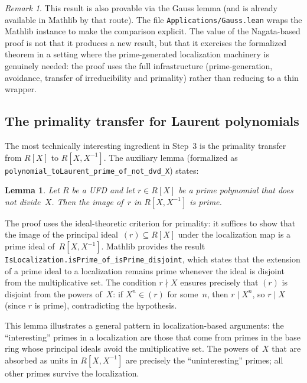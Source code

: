 \documentclass[11pt]{article}
\theoremstyle{plain}
\newtheorem{lemma}[theorem]{Lemma}
\theoremstyle{definition}
\theoremstyle{remark}
\newtheorem{remark}[theorem]{Remark}
\newcommand{\li}[1]{\texorpdfstring{\texttt{#1}}{#1}}
\newcommand{\lf}[1]{\texorpdfstring{\nolinkurl{#1}}{#1}}
\begin{document}
\begin{remark}
This result is also provable via the Gauss lemma (and is already available in
Mathlib by that route).  The file \lf{Applications/Gauss.lean} wraps the
Mathlib instance to make the comparison explicit.  The value of the
Nagata-based proof is not that it produces a new result, but that it exercises
the formalized theorem in a setting where the prime-generated localization
machinery is genuinely needed: the proof uses the full infrastructure
(prime-generation, avoidance, transfer of irreducibility and primality) rather
than reducing to a thin wrapper.
\end{remark}

\subsection{The primality transfer for Laurent polynomials}\label{sec:laurent-prime}

The most technically interesting ingredient in Step~3 is the primality
transfer from $R[X]$ to $R[X,X^{-1}]$.  The auxiliary lemma (formalized as
\li{polynomial\_toLaurent\_prime\_of\_not\_dvd\_X}) states:

\begin{lemma}\label{lem:laurent-prime}
Let $R$ be a UFD and let $r\in R[X]$ be a prime polynomial that does not
divide~$X$.  Then the image of~$r$ in $R[X,X^{-1}]$ is prime.
\end{lemma}

\noindent
The proof uses the ideal-theoretic criterion for primality: it suffices to show
that the image of the principal ideal~$(r)\subseteq R[X]$ under the
localization map is a prime ideal of~$R[X,X^{-1}]$.  Mathlib provides the
result \li{IsLocalization.isPrime\_of\_isPrime\_disjoint}, which states that
the extension of a prime ideal to a localization remains prime whenever the
ideal is disjoint from the multiplicative set.  The condition $r\nmid X$
ensures precisely that $(r)$ is disjoint from the powers of~$X$: if
$X^n\in(r)$ for some~$n$, then $r\mid X^n$, so $r\mid X$ (since $r$ is
prime), contradicting the hypothesis.

This lemma illustrates a general pattern in localization-based arguments: the
``interesting'' primes in a localization are those that come from primes in the
base ring whose principal ideals avoid the multiplicative set.  The powers
of~$X$ that are absorbed as units in $R[X,X^{-1}]$ are precisely the
``uninteresting'' primes; all other primes survive the localization.
\end{document}
